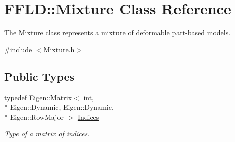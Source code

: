 \hypertarget{class_f_f_l_d_1_1_mixture}{\section{F\-F\-L\-D\-:\-:Mixture Class Reference}
\label{class_f_f_l_d_1_1_mixture}
}


The \hyperlink{class_f_f_l_d_1_1_mixture}{Mixture} class represents a mixture of deformable part-\/based models.  




{\ttfamily \#include $<$Mixture.\-h$>$}

\subsection*{Public Types}
\begin{DoxyCompactItemize}
\item 
\hypertarget{class_f_f_l_d_1_1_mixture_a31d98d583481cbd0d8c302dae0ab3421}{typedef Eigen\-::\-Matrix$<$ int, \\*
Eigen\-::\-Dynamic, Eigen\-::\-Dynamic, \\*
Eigen\-::\-Row\-Major $>$ \hyperlink{class_f_f_l_d_1_1_mixture_a31d98d583481cbd0d8c302dae0ab3421}{Indices}}\label{class_f_f_l_d_1_1_mixture_a31d98d583481cbd0d8c302dae0ab3421}

\begin{DoxyCompactList}\small\item\em Type of a matrix of indices. \end{DoxyCompactList}\end{DoxyCompactItemize}
